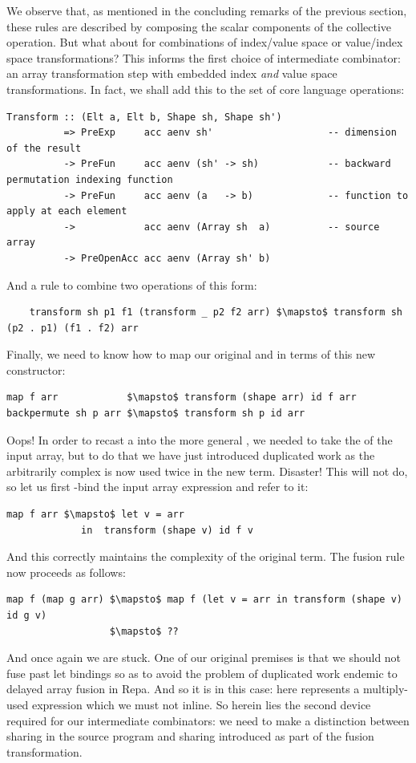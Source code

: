 We observe that, as mentioned in the concluding remarks of the previous section,
these rules are described by composing the scalar components of the collective
operation. But what about for combinations of index/value space or value/index
space transformations? This informs the first choice of intermediate combinator:
an array transformation step with embedded index \emph{and} value space
transformations. In fact, we shall add this to the set of core language
operations:
%
\begin{lstlisting}[style=haskell,numbers=none]
Transform :: (Elt a, Elt b, Shape sh, Shape sh')
          => PreExp     acc aenv sh'                    -- dimension of the result
          -> PreFun     acc aenv (sh' -> sh)            -- backward permutation indexing function
          -> PreFun     acc aenv (a   -> b)             -- function to apply at each element
          ->            acc aenv (Array sh  a)          -- source array
          -> PreOpenAcc acc aenv (Array sh' b)
\end{lstlisting}
%
And a rule to combine two operations of this form:
%
\begin{lstlisting}[style=haskell,numbers=none,mathescape]
%\bf$\langle$ RULE: transform/transform $\rangle$%
    transform sh p1 f1 (transform _ p2 f2 arr) $\mapsto$ transform sh (p2 . p1) (f1 . f2) arr
\end{lstlisting}
%
Finally, we need to know how to map our original  and
 in terms of this new constructor:
%
\begin{lstlisting}[style=haskell,numbers=none,mathescape]
map f arr            $\mapsto$ transform (shape arr) id f arr
backpermute sh p arr $\mapsto$ transform sh p id arr
\end{lstlisting}
%
Oops! In order to recast a  into the more general
, we needed to take the  of the input array, but
to do that we have just introduced duplicated work as the arbitrarily complex
 is now used twice in the new term. Disaster! This will not do, so
let us first -bind the input array expression and refer to it:
%
\begin{lstlisting}[style=haskell,numbers=none,mathescape]
map f arr $\mapsto$ let v = arr
             in  transform (shape v) id f v
\end{lstlisting}
%
And this correctly maintains the complexity of the original term. The
 fusion rule now proceeds as follows:
%
\begin{lstlisting}[style=haskell,numbers=none,mathescape]
map f (map g arr) $\mapsto$ map f (let v = arr in transform (shape v) id g v)
                  $\mapsto$ ??
\end{lstlisting}
%
And once again we are stuck. One of our original premises is that we should not
fuse past let bindings so as to avoid the problem of duplicated work
endemic to delayed array fusion in Repa. And so it is in this case: 
here represents a multiply-used expression which we must not inline. So herein
lies the second device required for our intermediate combinators: we need to
make a distinction between sharing in the source program and sharing introduced
as part of the fusion transformation.


